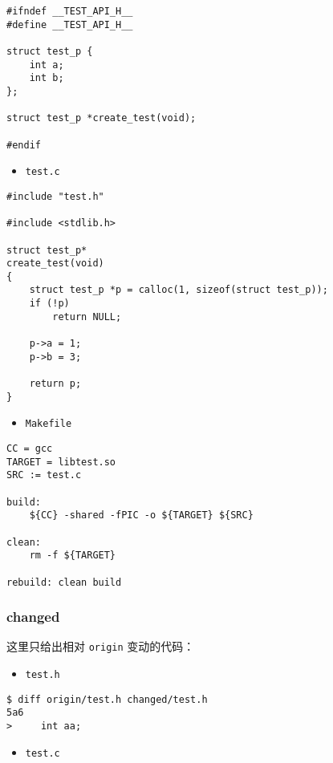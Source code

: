 \documentclass[a4paper,12pt]{article}
\begin{document}
\begin{verbatim}
#ifndef __TEST_API_H__
#define __TEST_API_H__

struct test_p {
    int a;
    int b;
};

struct test_p *create_test(void);

#endif
\end{verbatim}


\begin{itemize}
\item \texttt{test.c}
\end{itemize}

\begin{verbatim}
#include "test.h"

#include <stdlib.h>

struct test_p*
create_test(void)
{
    struct test_p *p = calloc(1, sizeof(struct test_p));
    if (!p)
        return NULL;

    p->a = 1;
    p->b = 3;

    return p;
}
\end{verbatim}

\begin{itemize}
\item \texttt{Makefile}
\end{itemize}

\begin{verbatim}
CC = gcc
TARGET = libtest.so
SRC := test.c

build:
    ${CC} -shared -fPIC -o ${TARGET} ${SRC}

clean:
    rm -f ${TARGET}

rebuild: clean build
\end{verbatim}

\newpage

\subsubsection{changed}
\label{sec:orgb3afe66}

这里只给出相对 \texttt{origin} 变动的代码：

\begin{itemize}
\item \texttt{test.h}
\end{itemize}

\begin{verbatim}
$ diff origin/test.h changed/test.h
5a6
>     int aa;
\end{verbatim}

\begin{itemize}
\item \texttt{test.c}
\end{itemize}
\end{document}
